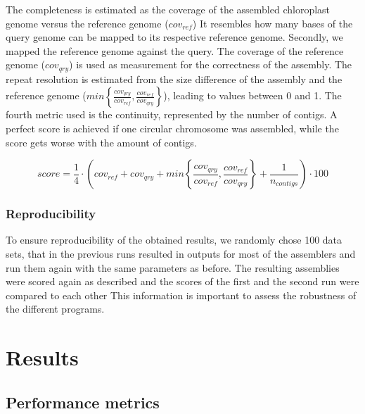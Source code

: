 \documentclass{bmcart}
\begin{document}
The completeness is estimated as the coverage of the assembled chloroplast genome versus the reference genome ($cov_{ref}$)
It resembles how many bases of the query genome can be mapped to its respective reference genome.
Secondly, we mapped the reference genome against the query.
The coverage of the reference genome ($cov_{qry}$) is used as measurement for the correctness of the assembly.
The repeat resolution is estimated from the size difference of the assembly and the reference genome ($min\left\{ \frac{cov_{qry}}{cov_{ref}}, \frac{cov_{ref}}{cov_{qry}}\right\}$), leading to values between 0 and 1.
The fourth metric used is the continuity, represented by the number of contigs.
A perfect score is achieved if one circular chromosome was assembled, while the score gets worse with the amount of contigs.

\begin{equation}
   score = \frac{1}{4} \cdot \left( cov_{ref} +  cov_{qry} + min\left\{ \frac{cov_{qry}}{cov_{ref}}, \frac{cov_{ref}}{cov_{qry}}\right\} + \frac{1}{n_{contigs} }\right) \cdot 100 
   \label{eq:quantitative}
\end{equation}

\subsubsection*{Reproducibility}
To ensure reproducibility of the obtained results, we randomly chose  \num{100} data sets, that in the previous runs resulted in outputs for most of the assemblers and run them again with the same parameters as before.
The resulting assemblies were scored again as described and the scores of the first and the second run were compared to each other
This information is important to assess the robustness of the different programs.

\section*{Results}
\subsection*{Performance metrics}
\end{document}
